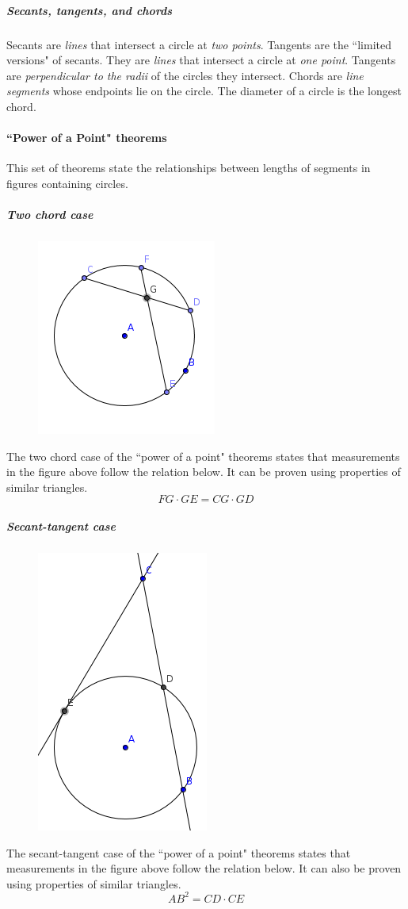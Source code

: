 \subparagraph{Secants, tangents, and chords}
Secants are \emph{lines} that intersect a circle at \emph{two points}.
Tangents are the ``limited versions" of secants.
They are \emph{lines} that intersect a circle at \emph{one point}.
Tangents are \emph{perpendicular to the radii} of the circles they intersect.
Chords are \emph{line segments} whose endpoints lie on the circle.
The diameter of a circle is the longest chord.

\paragraph{``Power of a Point" theorems}
This set of theorems state the relationships between lengths of segments in figures containing circles.

\subparagraph{Two chord case}
\begin{figure}[h!]
    \centering
    \includegraphics[scale=0.5]{assets/images/twochord.png}
\end{figure}
The two chord case of the ``power of a point" theorems states that measurements in the figure above follow the relation below.
It can be proven using properties of similar triangles.
$$FG\cdot GE = CG\cdot GD$$

\subparagraph{Secant-tangent case}
\begin{figure}[h!]
    \centering
    \includegraphics[scale=0.5]{assets/images/secant-tangent.png}
\end{figure}
The secant-tangent case of the ``power of a point" theorems states that measurements in the figure above follow the relation below.
It can also be proven using properties of similar triangles.
$$AB^2 = CD \cdot CE$$

